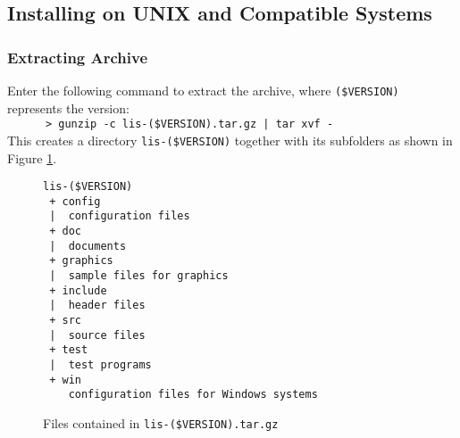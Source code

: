 \documentclass[a4paper]{article}
\begin{document}
\subsection{Installing on UNIX and Compatible Systems}
\subsubsection{Extracting Archive}
Enter the following command to extract the archive, 
where \verb|($VERSION)| represents the version:\\
 \verb&      > gunzip -c lis-($VERSION).tar.gz | tar xvf - &\\
This creates a directory {\tt lis-(\$VERSION)} together 
with its subfolders as shown in Figure \ref{listargz}.

\begin{figure}[htbp]
\begin{center}
\begin{verbatim}
lis-($VERSION)
 + config
 |  configuration files
 + doc
 |  documents
 + graphics
 |  sample files for graphics
 + include
 |  header files
 + src
 |  source files
 + test
 |  test programs
 + win
    configuration files for Windows systems
\end{verbatim}
\end{center}
\caption{Files contained in {\tt lis-(\$VERSION).tar.gz}}
\label{listargz}
\end{figure}
\end{document}
